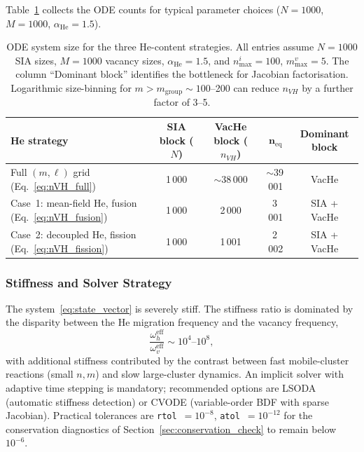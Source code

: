 Table~\ref{tab:system_size} collects the ODE counts for typical
parameter choices ($N = 1000$, $M = 1000$, $\alpha_{\mathrm{He}} = 1.5$).

\begin{table}[htbp]
\centering
\caption{ODE system size for the three He-content strategies. All
entries assume $N = 1000$ SIA sizes, $M = 1000$ vacancy sizes,
$\alpha_{\mathrm{He}} = 1.5$, and $n_{\max}^i = 100$, $m_{\max}^v = 5$.
The column ``Dominant block'' identifies the bottleneck for
Jacobian factorisation. Logarithmic size-binning for
$m > m_{\mathrm{group}} \sim 100$--200 can reduce $n_{VH}$ by a further
factor of 3--5.}
\label{tab:system_size}
\renewcommand{\arraystretch}{1.25}
\begin{tabular}{@{}lcccc@{}}
\toprule
\textbf{He strategy} & \textbf{SIA block ($N$)}
  & \textbf{VacHe block ($n_{VH}$)}
  & $\mathbf{n_{\mathrm{eq}}}$
  & \textbf{Dominant block} \\
\midrule
Full $(m,\ell)$ grid (Eq.~\ref{eq:nVH_full})
  & 1\,000 & $\sim$38\,000 & $\sim$39\,001 & VacHe \\
Case~1: mean-field He, fusion (Eq.~\ref{eq:nVH_fusion})
  & 1\,000 & 2\,000 & 3\,001 & SIA + VacHe \\
Case~2: decoupled He, fission (Eq.~\ref{eq:nVH_fission})
  & 1\,000 & 1\,001 & 2\,002 & SIA + VacHe \\
\bottomrule
\end{tabular}
\end{table}

\subsubsection{Stiffness and Solver Strategy}
\label{sec:solver}

The system~\eqref{eq:state_vector} is severely stiff. The stiffness
ratio is dominated by the disparity between the He migration frequency
and the vacancy frequency,
\begin{equation}\label{eq:stiffness}
    \frac{\omega_h^{\mathrm{eff}}}{\omega_v^{\mathrm{eff}}}
    \sim 10^4\text{--}10^8,
\end{equation}
with additional stiffness contributed by the contrast between
fast mobile-cluster reactions (small $n,m$) and slow large-cluster
dynamics. An implicit solver with adaptive time stepping is mandatory;
recommended options are LSODA (automatic stiffness detection) or CVODE
(variable-order BDF with sparse Jacobian). Practical tolerances are
\texttt{rtol}~$= 10^{-8}$, \texttt{atol}~$= 10^{-12}$ for the
conservation diagnostics of Section~\ref{sec:conservation_check} to
remain below $10^{-6}$.

